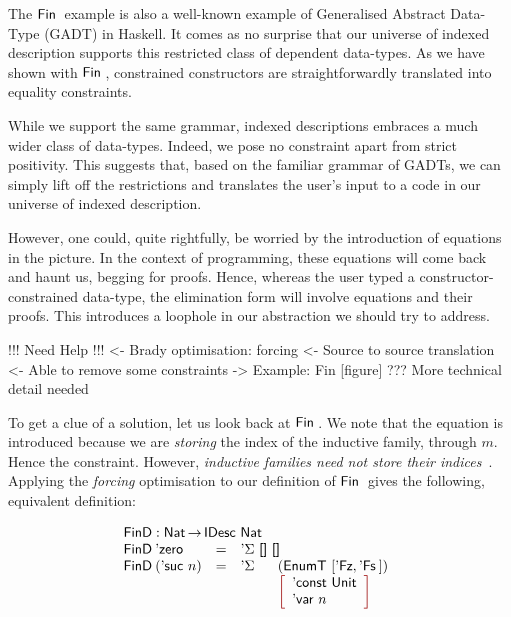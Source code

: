 The $\Fin$ example is also a well-known example of Generalised
Abstract Data-Type (GADT) in Haskell. It comes as no surprise that our
universe of indexed description supports this restricted class of
dependent data-types. As we have shown with $\Fin$, constrained
constructors are straightforwardly translated into equality
constraints.

While we support the same grammar, indexed descriptions embraces a
much wider class of data-types. Indeed, we pose no constraint apart
from strict positivity. This suggests that, based on
the familiar grammar of GADTs, we can simply lift off the restrictions and
translates the user's input to a code in our universe of indexed description. 

However, one could, quite rightfully, be worried by the introduction
of equations in the picture. In the context of programming, these
equations will come back and haunt us, begging for proofs. Hence,
whereas the user typed a constructor-constrained data-type, the
elimination form will involve equations and their proofs. This
introduces a loophole in our abstraction we should try to address.


\begin{wstructure}
!!! Need Help !!!
<- Brady optimisation: forcing
    <- Source to source translation
    <- Able to remove some constraints
    -> Example: Fin [figure]
    ??? More technical detail needed
\end{wstructure}

To get a clue of a solution, let us look back at $\Fin$. We note that
the equation is introduced because we are \emph{storing} the index of
the inductive family, through $m$. Hence the constraint. However,
\emph{inductive families need not store their
  indices}~\cite{brady:index-inductive-families}. Applying the
\emph{forcing} optimisation to our definition of $\Fin$ gives the
following, equivalent definition:

\[\stk{
\FinD : \Nat \To \IDesc{\Nat} \\
\begin{array}{@{}llll}
\FinD\: \NatZero     & = & \multicolumn{2}{l}{\DSigma{\Void}{\Void} } \\
\FinD\: (\NatSuc{n}) & = & \DSigma{}{} & (\EnumT{[ \FinZero , \FinSuc{} ]}) \\
                     &   &             & \bigRedBracket{
                                         \begin{array}{l}
                                         \DConst{\Unit} \\
                                         \DVar{n}
                                         \end{array}
                                         }
\end{array}
}\]

